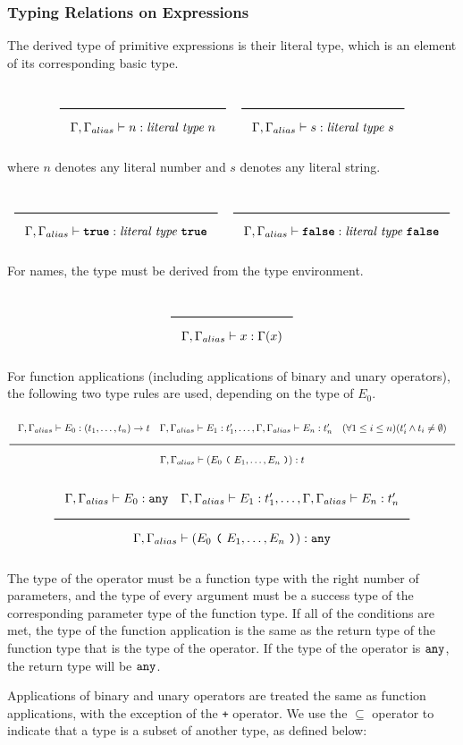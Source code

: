 \subsubsection{Typing Relations on Expressions}

The derived type of primitive expressions is their literal type, which is an element of its corresponding basic type.

\noindent
\[
  \Rule{}{\Gamma, \Gamma_{alias} \vdash n : \textit{literal type}\ n}
  \quad
  \Rule{}{\Gamma, \Gamma_{alias} \vdash s : \textit{literal type}\ s}
\]
\noindent

where $n$ denotes any literal number and $s$ denotes any literal string.

\noindent
\[
  \Rule{}{\Gamma, \Gamma_{alias} \vdash \TruE : \textit{literal type}\ \TruE}
  \quad
  \Rule{}{\Gamma, \Gamma_{alias} \vdash \FalsE : \textit{literal type}\ \FalsE}
\]
\noindent

For names, the type must be derived from the type environment.

\noindent
\[
  \Rule{}{\Gamma, \Gamma_{alias} \vdash x : \Gamma(x)}
\]
\noindent

For function applications (including applications of binary and unary operators), the following two type rules are used, depending on the type of $E_0$.

\noindent
\[
\Rule{\Gamma, \Gamma_{alias} \vdash E_0 : (t_1, \ldots, t_n) \rightarrow t \quad \Gamma, \Gamma_{alias} \vdash E_1 : t'_1, \ldots,  \Gamma, \Gamma_{alias} \vdash E_n : t'_n
  \quad (\forall 1 \leq i \leq n)(t'_i \wedge t_i \neq \emptyset)}{\Gamma, \Gamma_{alias} \vdash (E_0\ \Lp \ E_1, \ldots, E_n\ \Rp) : t}
\]
\noindent
\[
  \Rule{\Gamma, \Gamma_{alias} \vdash E_0 : \Any \quad \Gamma, \Gamma_{alias} \vdash E_1 : t'_1, \ldots, \Gamma, \Gamma_{alias} \vdash E_n : t'_n
    }{\Gamma, \Gamma_{alias} \vdash (E_0\ \Lp \ E_1, \ldots, E_n\ \Rp) : \Any}
\]
\noindent

The type of the operator must be a function type with the right number of parameters,
and the type of every argument must be a success type of the corresponding parameter type of the function type.
If all of the conditions are met, the type of the function application is the same
as the return type of the function type that is the type of the operator.
If the type of the operator is $\texttt{any}$, the return type will be $\texttt{any}$.

Applications of binary and unary operators are treated the same as function applications, with the exception of the \texttt{+} operator.
We use the $\subseteq$ operator to indicate that a type is a subset of another type, as defined below:

